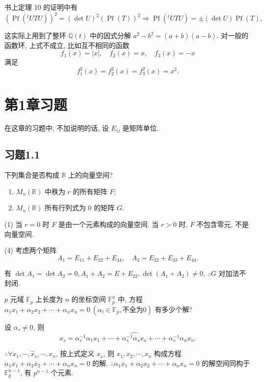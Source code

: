 \documentclass[color=black,device=normal,lang=cn,mode=geye]{elegantnote}
\begin{document}
书上定理 10 的证明中有
\[(\operatorname{Pf}({}^tUTU))^2=(\det U)^2(\operatorname{Pf}(T))^2\Rightarrow\operatorname{Pf}({}^tUTU)=\pm(\det U)\operatorname{Pf}(T),\]

这实际上用到了整环 $\mathbb{Q}(t)$ 中的因式分解 $a^2-b^2=(a+b)(a-b)$. 对一般的函数环, 上式不成立, 比如互不相同的函数
\[f_1(x)=|x|,\quad f_2(x)=x,\quad f_3(x)=-x\]
满足
\[f_1^2(x)=f_2^2(x)=f_3^2(x)=x^2.\]
\section{第1章习题}
在这章的习题中, 不加说明的话, 设 $E_{ij}$ 是矩阵单位.
\subsection{习题1.1}
\begin{exercise}%
    下列集合是否构成 $\mathbb{R}$ 上的向量空间?
    \begin{enumerate}
        \def\labelenumi{(\arabic{enumi})}
        \item $M_n(\mathbb{R})$ 中秩为 $r$ 的所有矩阵 $F$;\addtocounter{enumi}{2}
        \item $M_n(\mathbb{R})$ 所有行列式为 $0$ 的矩阵 $G$.
    \end{enumerate}
\end{exercise}
\begin{solution}
    (1) 当 $r=0$ 时 $F$ 是由一个元素构成的向量空间. 当 $r>0$ 时, $F$ 不包含零元, 不是向量空间.
    
    (4) 考虑两个矩阵
    \[A_1=E_{11}+E_{22}+E_{44},\quad A_2=E_{22}+E_{33}+E_{44}.\]

    有 $\det A_1=\det A_2=0,A_1+A_2=E+E_{22},\det(A_1+A_2)\neq0$, $\therefore G$ 对加法不封闭.
\end{solution}
\begin{exercise}[2]%
    $p$ 元域 $\mathbb{F}_p$ 上长度为 $n$ 的坐标空间 $\mathbb{F}_p^n$ 中, 方程 $\alpha_1x_1+\alpha_2x_2+\cdots+\alpha_nx_n=0\ (\alpha_i\in\mathbb{F}_p,\text{不全为}0)$ 有多少个解?
\end{exercise}
\begin{solution}
    设 $\alpha_s\neq0$, 则
    \[x_s=\alpha_s^{-1}\alpha_1x_1+\cdots+\widehat{\alpha_s^{-1}\alpha_sx_s}+\cdots+\alpha_s^{-1}\alpha_nx_n.\]

    $\therefore\forall x_1,\cdots,\hat{x}_s,\cdots,x_n$, 按上式定义 $x_s$, 则 $x_1,x_2,\cdots,x_n$ 构成方程 $\alpha_1x_1+\alpha_2x_2+\cdots+\alpha_nx_n=0$ 的解. $\therefore\alpha_1x_1+\alpha_2x_2+\cdots+\alpha_nx_n=0$ 的解空间同构于 $\mathbb{F}_p^{n-1}$, 有 $p^{n-1}$ 个元素.
\end{solution}
\end{document}
